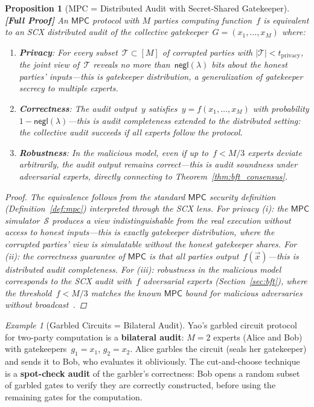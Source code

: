 \documentclass[12pt,a4paper]{article}
\newtheorem{proposition}[theorem]{Proposition}
\theoremstyle{remark}
\newtheorem{example}[theorem]{Example}
\newcommand{\T}{\mathcal{T}}
\newcommand{\SCX}{\textsf{SCX}}
\newcommand{\MPC}{\textsf{MPC}}
\newcommand{\Sim}{\mathcal{S}}
\newcommand{\negl}{\textsf{negl}}
\newcommand{\rigorFull}{\textbf{[Full Proof]}}
\begin{document}
\begin{proposition}[MPC = Distributed Audit with Secret-Shared Gatekeeper]
\label{prop:mpc_shared_g}
\rigorFull
An $\MPC$ protocol with $M$ parties computing function~$f$ is equivalent to an \SCX{} distributed audit of the collective gatekeeper~$G = (x_1, \ldots, x_M)$ where:
\begin{enumerate}[leftmargin=*, label=(\roman*)]
  \item \textbf{Privacy}: For every subset~$\T \subset [M]$ of corrupted parties with $|\T| < t_{\text{privacy}}$, the joint view of~$\T$ reveals no more than~$\negl(\lambda)$ bits about the honest parties' inputs---this is gatekeeper distribution, a generalization of gatekeeper secrecy to multiple experts.
  \item \textbf{Correctness}: The audit output~$y$ satisfies~$y = f(x_1, \ldots, x_M)$ with probability $1 - \negl(\lambda)$---this is audit completeness extended to the distributed setting: the collective audit succeeds if all experts follow the protocol.
  \item \textbf{Robustness}: In the malicious model, even if up to~$f < M/3$ experts deviate arbitrarily, the audit output remains correct---this is audit soundness under adversarial experts, directly connecting to Theorem~\ref{thm:bft_consensus}.
\end{enumerate}

\begin{proof}
The equivalence follows from the standard $\MPC$ security definition (Definition~\ref{def:mpc}) interpreted through the \SCX{} lens. For privacy (i): the $\MPC$ simulator~$\Sim$ produces a view indistinguishable from the real execution without access to honest inputs---this is exactly gatekeeper distribution, where the corrupted parties' view is simulatable without the honest gatekeeper shares. For (ii): the correctness guarantee of $\MPC$ is that all parties output~$f(\vec{x})$---this is distributed audit completeness. For (iii): robustness in the malicious model corresponds to the \SCX{} audit with~$f$ adversarial experts (Section~\ref{sec:bft}), where the threshold~$f < M/3$ matches the known $\MPC$ bound for malicious adversaries without broadcast~\cite{cleve1986limits}.
\end{proof}
\end{proposition}

\begin{example}[Garbled Circuits = Bilateral Audit]
\label{ex:garbled_circuits}
Yao's garbled circuit protocol~\cite{yao1982protocols} for two-party computation is a \textbf{bilateral audit}: $M = 2$ experts (Alice and Bob) with gatekeepers~$g_1 = x_1$, $g_2 = x_2$. Alice garbles the circuit (seals her gatekeeper) and sends it to Bob, who evaluates it obliviously. The cut-and-choose technique~\cite{lindell2007cut} is a \textbf{spot-check audit} of the garbler's correctness: Bob opens a random subset of garbled gates to verify they are correctly constructed, before using the remaining gates for the computation.
\end{example}
\end{document}
